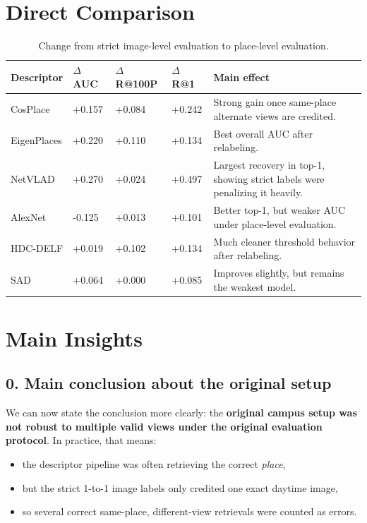 \documentclass[11pt]{article}
\begin{document}
\section{Direct Comparison}
\begin{table}[H]
\centering
\small
\begin{tabularx}{\textwidth}{L{2.2cm}C{1.2cm}C{1.4cm}C{1.1cm}Y}
\toprule
\textbf{Descriptor} & \textbf{$\Delta$ AUC} & \textbf{$\Delta$ R@100P} & \textbf{$\Delta$ R@1} & \textbf{Main effect} \\
\midrule
CosPlace    & +0.157 & +0.084 & +0.242 & Strong gain once same-place alternate views are credited. \\
EigenPlaces & +0.220 & +0.110 & +0.134 & Best overall AUC after relabeling. \\
NetVLAD     & +0.270 & +0.024 & +0.497 & Largest recovery in top-1, showing strict labels were penalizing it heavily. \\
AlexNet     & -0.125 & +0.013 & +0.101 & Better top-1, but weaker AUC under place-level evaluation. \\
HDC-DELF    & +0.019 & +0.102 & +0.134 & Much cleaner threshold behavior after relabeling. \\
SAD         & +0.064 & +0.000 & +0.085 & Improves slightly, but remains the weakest model. \\
\bottomrule
\end{tabularx}
\caption{Change from strict image-level evaluation to place-level evaluation.}
\end{table}

\section{Main Insights}
\subsection*{0. Main conclusion about the original setup}
We can now state the conclusion more clearly: the \textbf{original campus setup was not robust to multiple valid views under the original evaluation protocol}. In practice, that means:
\begin{itemize}[leftmargin=*]
  \item the descriptor pipeline was often retrieving the correct \emph{place},
  \item but the strict 1-to-1 image labels only credited one exact daytime image,
  \item so several correct same-place, different-view retrievals were counted as errors.
\end{itemize}
\end{document}
